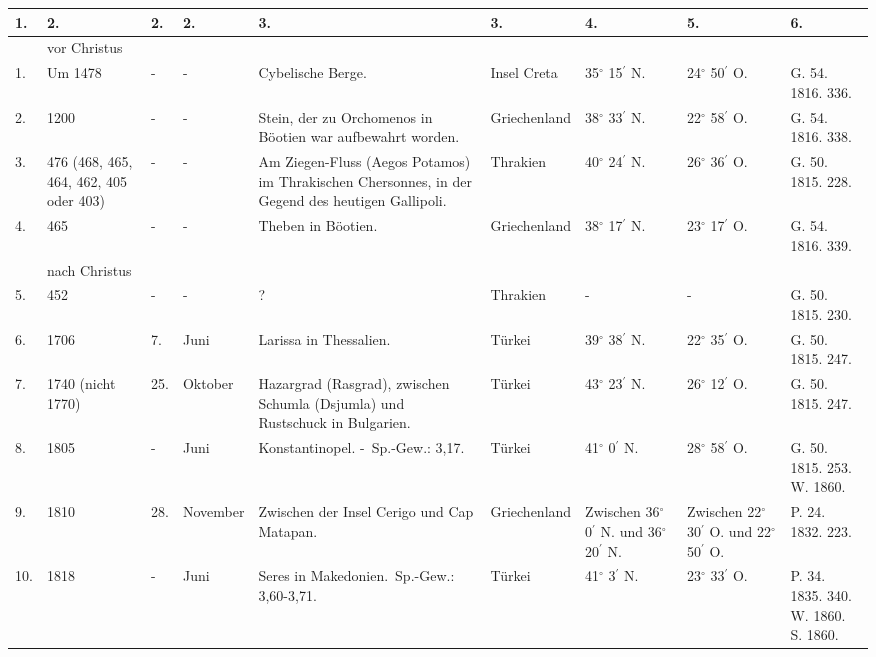 \documentclass[a4paper, 11pt, oneside, polutonikogreek, german]{article}
\begin{document}
\begin{table}[!ht]
    \centering
    \begin{tabular}{|l|l|l|l|l|l|l|l|l|}
    \hline
        1. & 2. & 2. & 2. & 3. & 3. & 4. & 5. & 6. \\ \hline
          & vor Christus &   &   &   &   &   &   &   \\ \hline
        1. & Um 1478 & - & - & Cybelische Berge. & Insel Creta & 35$^\circ$ 15$^\prime$ N. & 24$^\circ$ 50$^\prime$ O. & G. 54. 1816. 336. \\ \hline
        2. & 1200 & - & - & Stein, der zu Orchomenos in Böotien war aufbewahrt worden. & Griechenland & 38$^\circ$ 33$^\prime$ N. & 22$^\circ$ 58$^\prime$ O. & G. 54. 1816. 338. \\ \hline
        3. & 476 (468, 465, 464, 462, 405 oder 403) & - & - & Am Ziegen-Fluss (Aegos Potamos) im Thrakischen Chersonnes, in der Gegend des heutigen Gallipoli. & Thrakien & 40$^\circ$ 24$^\prime$ N. & 26$^\circ$ 36$^\prime$ O. & G. 50. 1815. 228. \\ \hline
        4. & 465 & - & - & Theben in Böotien. & Griechenland & 38$^\circ$ 17$^\prime$ N. & 23$^\circ$ 17$^\prime$ O. & G. 54. 1816. 339. \\ \hline
          & nach Christus &   &   &   &   &   &   &   \\ \hline
        5. & 452 & - & - & ? & Thrakien & - & - & G. 50. 1815. 230. \\ \hline
        6. & 1706 & 7. & Juni & Larissa in Thessalien. & Türkei & 39$^\circ$ 38$^\prime$ N. & 22$^\circ$ 35$^\prime$ O. & G. 50. 1815. 247. \\ \hline
        7. & 1740 (nicht 1770) & 25. & Oktober & Hazargrad (Rasgrad), zwischen Schumla (Dsjumla) und Rustschuck in Bulgarien. & Türkei & 43$^\circ$ 23$^\prime$ N. & 26$^\circ$ 12$^\prime$ O. & G. 50. 1815. 247. \\ \hline
        8. & 1805 & - & Juni & Konstantinopel. - Sp.-Gew.: 3,17. & Türkei & 41$^\circ$ 0$^\prime$ N. & 28$^\circ$ 58$^\prime$ O. & G. 50. 1815. 253. W. 1860. \\ \hline
        9. & 1810 & 28. & November & Zwischen der Insel Cerigo und Cap Matapan. & Griechenland & Zwischen 36$^\circ$ 0$^\prime$ N. und 36$^\circ$ 20$^\prime$ N. & Zwischen 22$^\circ$ 30$^\prime$ O. und 22$^\circ$ 50$^\prime$ O. & P. 24. 1832. 223. \\ \hline
        10. & 1818 & - & Juni & Seres in Makedonien. Sp.-Gew.: 3,60-3,71. & Türkei & 41$^\circ$ 3$^\prime$ N. & 23$^\circ$ 33$^\prime$ O. & P. 34. 1835. 340. W. 1860. S. 1860. \\ \hline

\end{tabular}
\end{table}
\end{document}
